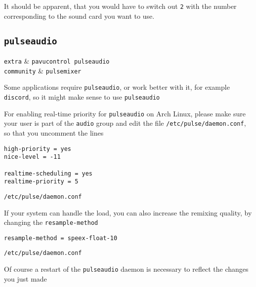 \documentclass[10pt]{dustdoc}
\begin{document}
\begin{NOTE}
    It should be apparent, that you would have to switch out \texttt{2} with the number corresponding to the sound card you want to use.
\end{NOTE}

\subsection{\texttt{pulseaudio}}%
\label{sec:pulseaudio}

\begin{pkgtable}
    \texttt{extra} & \texttt{pavucontrol pulseaudio} \\
    \texttt{community} & \texttt{pulsemixer} \\
\end{pkgtable}

Some applications require \texttt{pulseaudio}, or work better with it, for example \texttt{discord}, so it might make sense to use \texttt{pulseaudio}

For enabling real-time priority for \texttt{pulseaudio} on Arch Linux, please make sure your user is part of the \texttt{audio} group and edit the file \texttt{/etc/pulse/daemon.conf}, so that you uncomment the lines

\begin{mintedlisting}
    \begin{verbatim}
high-priority = yes
nice-level = -11

realtime-scheduling = yes
realtime-priority = 5
    \end{verbatim}

    \caption{\texttt{/etc/pulse/daemon.conf}}
\end{mintedlisting}

If your system can handle the load, you can also increase the remixing quality, by changing the \texttt{resample-method}

\begin{mintedlisting}
    \begin{verbatim}
resample-method = speex-float-10
    \end{verbatim}

    \caption{\texttt{/etc/pulse/daemon.conf}}
\end{mintedlisting}

Of course a restart of the \texttt{pulseaudio} daemon is necessary to reflect the changes you just made
\end{document}
